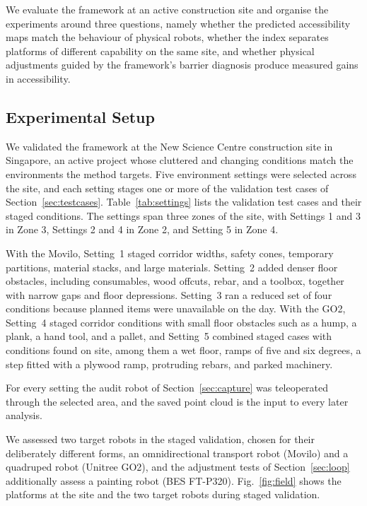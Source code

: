 \documentclass[a4paper, 10pt, conference]{ieeeconf}
\begin{document}
We evaluate the framework at an active construction site and organise the experiments around three questions, namely whether the predicted accessibility maps match the behaviour of physical robots, whether the index separates platforms of different capability on the same site, and whether physical adjustments guided by the framework's barrier diagnosis produce measured gains in accessibility.

\subsection{Experimental Setup}
\label{sec:setup}
We validated the framework at the New Science Centre construction site in Singapore, an active project whose cluttered and changing conditions match the environments the method targets. Five environment settings were selected across the site, and each setting stages one or more of the validation test cases of Section~\ref{sec:testcases}. Table~\ref{tab:settings} lists the validation test cases and their staged conditions. The settings span three zones of the site, with Settings 1 and 3 in Zone 3, Settings 2 and 4 in Zone 2, and Setting 5 in Zone 4.

With the Movilo, Setting~1 staged corridor widths, safety cones, temporary partitions, material stacks, and large materials. Setting~2 added denser floor obstacles, including consumables, wood offcuts, rebar, and a toolbox, together with narrow gaps and floor depressions. Setting~3 ran a reduced set of four conditions because planned items were unavailable on the day. With the GO2, Setting~4 staged corridor conditions with small floor obstacles such as a hump, a plank, a hand tool, and a pallet, and Setting~5 combined staged cases with conditions found on site, among them a wet floor, ramps of five and six degrees, a step fitted with a plywood ramp, protruding rebars, and parked machinery.
 
For every setting the audit robot of Section~\ref{sec:capture} was teleoperated through the selected area, and the saved point cloud is the input to every later analysis.
 
We assessed two target robots in the staged validation, chosen for their deliberately different forms, an omnidirectional transport robot (Movilo) and a quadruped robot (Unitree GO2), and the adjustment tests of Section~\ref{sec:loop} additionally assess a painting robot (BES FT-P320). Fig.~\ref{fig:field} shows the platforms at the site and the two target robots during staged validation.
\end{document}
